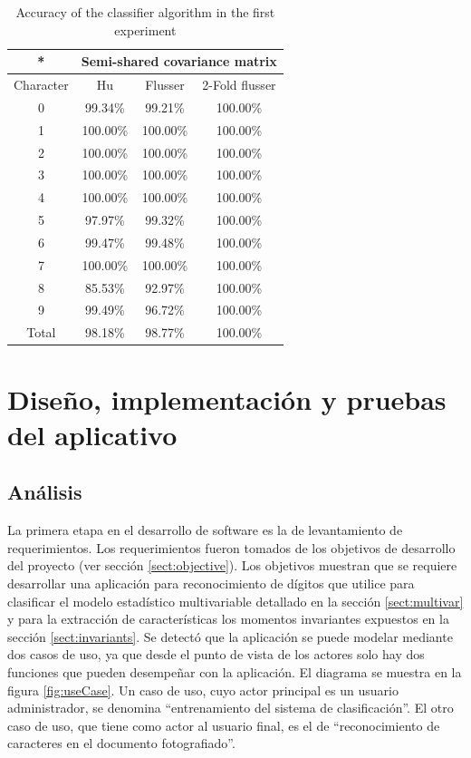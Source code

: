 \documentclass[a4paper, 11pt, oneside]{report}
\begin{document}
	\begin{table}
	\begin{center}
	\begin{tabular}{|c|c|c|c|}
		\hline
		* & \multicolumn{3}{|c|}{Semi-shared covariance matrix} \\
		\hline
		Character & Hu & Flusser & 2-Fold flusser\\
		\hline
		0 & 99.34\% & 99.21\% & 100.00\% \\
		1 &	100.00\% & 100.00\% & 100.00\% \\
		2 &	100.00\% & 100.00\% & 100.00\% \\
		3 &	100.00\% & 100.00\% & 100.00\% \\
		4 &	100.00\% & 100.00\%	& 100.00\% \\		
		5 & 97.97\% & 99.32\% & 100.00\% \\ 
		6 & 99.47\% & 99.48\% & 100.00\% \\
		7 & 100.00\% & 100.00\% & 100.00\% \\
		8 & 85.53\% & 92.97\% & 100.00\% \\
		9 &	99.49\% & 96.72\% & 100.00\% \\
		\hline
		Total & 98.18\% & 98.77\% & 100.00\% \\
		\hline
	\end{tabular}
	\end{center}
	\caption{Accuracy of the classifier algorithm in the first experiment}	
	\label{tb:exp3}
	\end{table}

\chapter{Diseño, implementación y pruebas del aplicativo}
\label{chap:ingSw}

\section{Análisis}

La primera etapa en el desarrollo de software es la de levantamiento de requerimientos. Los requerimientos fueron tomados de los objetivos de desarrollo del proyecto (ver sección \ref{sect:objective}). Los objetivos muestran que se requiere desarrollar una aplicación para reconocimiento de dígitos que utilice para clasificar el modelo estadístico multivariable detallado en la sección \ref{sect:multivar} y para la extracción de características los momentos invariantes expuestos en la sección \ref{sect:invariants}.\newline \newline
Se detectó que la aplicación se puede modelar mediante dos casos de uso, ya que desde el punto de vista de los actores solo hay dos funciones que pueden desempeñar con la aplicación. El diagrama se muestra en la figura \ref{fig:useCase}. Un caso de uso, cuyo actor principal es un usuario administrador, se denomina ``entrenamiento del sistema de clasificación''. El otro caso de uso, que tiene como actor al usuario final, es el de ``reconocimiento de caracteres en el documento fotografiado''.
\end{document}
